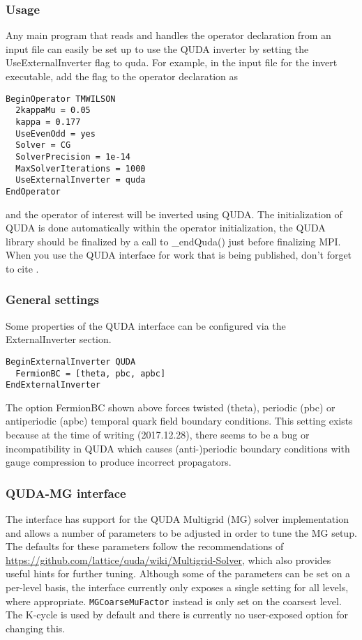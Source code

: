 \subsubsection{Usage}
Any main program that reads and handles the operator declaration from an input file can easily be set up to use the QUDA inverter by setting the {\ttfamily UseExternalInverter} flag to {\ttfamily quda}. For example, in the input file for the {\ttfamily invert} executable, add the flag to the operator declaration as
\begin{verbatim}
BeginOperator TMWILSON
  2kappaMu = 0.05
  kappa = 0.177
  UseEvenOdd = yes
  Solver = CG
  SolverPrecision = 1e-14
  MaxSolverIterations = 1000
  UseExternalInverter = quda
EndOperator
\end{verbatim}
and the operator of interest will be inverted using QUDA. The initialization of QUDA is done automatically within the operator initialization,  the QUDA library should be finalized by a call to {\ttfamily \_endQuda()} just before finalizing MPI. When you use the QUDA interface for work that is being published, don't forget to cite \cite{Clark:2009wm, Babich:2011np, Strelchenko:2013vaa}.

\subsubsection{General settings}
Some properties of the QUDA interface can be configured via the {\ttfamily ExternalInverter} section.
\begin{verbatim}
BeginExternalInverter QUDA
  FermionBC = [theta, pbc, apbc]
EndExternalInverter
\end{verbatim}

The option {\ttfamily FermionBC} shown above forces twisted ({\ttfamily theta}), periodic ({\ttfamily pbc}) or antiperiodic ({\ttfamily apbc}) temporal quark field boundary conditions.
This setting exists because at the time of writing (2017.12.28), there seems to be a bug or incompatibility in QUDA which causes (anti-)periodic boundary conditions with gauge compression to produce incorrect propagators.

\subsubsection{QUDA-MG interface}
The interface has support for the QUDA Multigrid (MG) solver implementation and allows a number of parameters to be adjusted in order to tune the MG setup.
The defaults for these parameters follow the recommendations of \url{https://github.com/lattice/quda/wiki/Multigrid-Solver}, which also provides useful hints for further tuning.
Although some of the parameters can be set on a per-level basis, the interface currently only exposes a single setting for all levels, where appropriate.
\texttt{MGCoarseMuFactor} instead is only set on the coarsest level.
The K-cycle is used by default and there is currently no user-exposed option for changing this.


